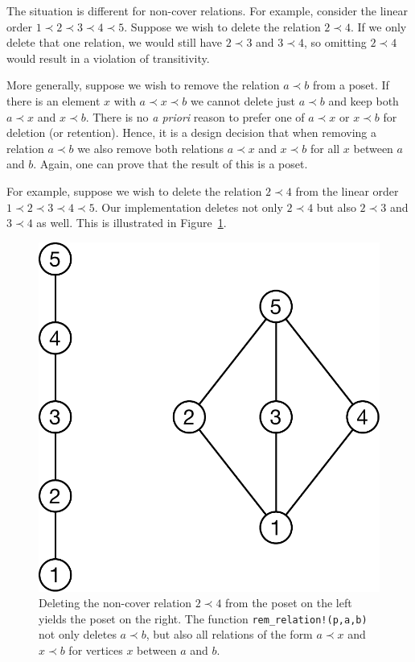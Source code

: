 \documentclass[12pt]{article}
\begin{document}
The situation is different for non-cover relations. For example,
consider the linear order $1\prec2\prec3\prec4\prec5$. Suppose we
wish to delete the relation $2\prec4$. If we only delete that one
relation, we would still have $2\prec3$ and $3\prec4$, so omitting
$2\prec4$ would result in a violation of transitivity. 

More generally, suppose we wish to remove the relation $a\prec b$ from
a poset. If there is an element $x$ with $a\prec x\prec b$ we cannot
delete just $a\prec b$ and keep both $a \prec x$ and $x\prec b$. There
is no \emph{a priori} reason to prefer one of $a\prec x$ or $x \prec
b$ for deletion (or retention). Hence, it is a design decision that
when removing a relation $a \prec b$ we also remove both relations $a
\prec x$ and $x \prec b$ for all $x$ between $a$ and $b$.  Again, one
can prove that the result of this is a poset.

For example, suppose we wish to delete the relation $2\prec4$ from the
linear order $1 \prec 2 \prec 3 \prec 4 \prec 5$. Our implementation
deletes not only $2\prec 4$ but also $2\prec3$ and $3\prec4$ as well. 
This is illustrated in Figure~\ref{fig:other-edge-deletion}. 
\begin{figure}[h]
  \begin{framed}
    \begin{center}
      \includegraphics[scale=0.4]{other-edge-deletion}
    \end{center}
    \caption{Deleting the non-cover relation $2\prec4$ from the poset on the left
    yields the poset on the right. 
    The function \texttt{rem\_relation!(p,a,b)} not only deletes $a\prec b$, but also 
    all relations of the form $a\prec x$ and $x\prec b$ for vertices $x$
    between $a$ and $b$.}
    \label{fig:other-edge-deletion}
  \end{framed}
\end{figure}
\end{document}

